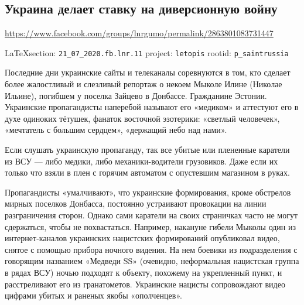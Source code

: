  
 

\subsection{Украина делает ставку на диверсионную войну}
\url{https://www.facebook.com/groups/lnrgumo/permalink/2863801083731447}
  
\vspace{0.5cm}
{\small\LaTeX section: \verb|21_07_2020.fb.lnr.11| project: \verb|letopis| rootid: \verb|p_saintrussia|}
\vspace{0.5cm}



Последние дни украинские сайты и телеканалы соревнуются в том, кто сделает
более жалостливый и слезливый репортаж о некоем Мыколе Илине (Николае Ильине),
погибшем у поселка Зайцево в Донбассе. Гражданине Эстонии. Украинские
пропагандисты наперебой называют его «медиком» и аттестуют его в духе одиноких
тётушек, фанаток восточной эзотерики: «светлый человечек», «мечтатель с большим
сердцем», «держащий небо над нами».

Если слушать украинскую пропаганду, так все убитые или плененные каратели из
ВСУ --- либо медики, либо механики-водители грузовиков. Даже если их только что
взяли в плен с горячим автоматом с опустевшим магазином в руках.

Пропагандисты «умалчивают», что украинские формирования, кроме обстрелов мирных
поселков Донбасса, постоянно устраивают провокации на линии разграничения
сторон. Однако сами каратели на своих страничках часто не могут сдержаться,
чтобы не похвастаться. Например, накануне гибели Мыколы один из
интернет-каналов украинских нацистских формирований опубликовал видео, снятое с
помощью прибора ночного видения. На нем боевики из подразделения с говорящим
названием «Медведи SS» (очевидно, неформальная нацистская группа в рядах ВСУ)
ночью подходят к объекту, похожему на укрепленный пункт, и расстреливают его из
гранатометов. Украинские нацисты сопровождают видео цифрами убитых и раненых
якобы «ополченцев».

